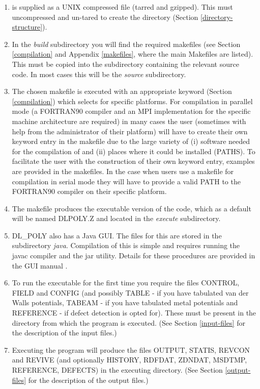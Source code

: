 \begin{enumerate}
\item \D is supplied as a UNIX compressed file (tarred and
gzipped).  This must uncompressed and un-tared to create the \D
directory (Section \ref{directory-structure}).

\item In the {\em build} subdirectory you will find the required
\D makefiles (see Section \ref{compilation} and Appendix
\ref{makefiles}, where the main Makefiles are listed).  This must be
copied into the subdirectory containing the relevant source code. In
most cases this will be the {\em source} subdirectory.

\item The chosen makefile is executed with an appropriate keyword
(Section \ref{compilation}) which selects for specific platforms.
For \D compilation in parallel mode (a FORTRAN90 compiler
and an MPI implementation for the specific machine architecture are
required) in many cases the user (sometimes with help from the
administrator of their platform) will have to create their own
keyword entry in the makefile due to the large variety of (i)
software needed for the compilation of \D and (ii) places where
it could be installed (PATHS).  To facilitate the user with the
construction of their own keyword entry, examples are provided
in the makefiles.  In the case when users use a makefile for \D
compilation in serial mode they will have to provide a valid
PATH to the FORTRAN90 compiler on their specific platform.

\item The makefile produces the executable version of the code,
which as a default will be named DLPOLY.Z and located in the {\em
execute} subdirectory.

\item DL\_POLY also has a Java GUI.  The files for this are stored
in the subdirectory {\em java}. Compilation of this is simple and
requires running the javac compiler and the jar utility.  Details
for these procedures are provided in the GUI manual
\cite{smith-gui}.

\item To run the executable for the first time you require the files
CONTROL, FIELD and CONFIG (and possibly TABLE - if you have
tabulated van der Walls potentials, TABEAM - if you have
tabulated metal potentials and REFERENCE - if defect detection is opted
for).  These must be present in the directory from which the program
is executed. (See Section \ref{input-files} for the description of
the input files.)

\item Executing the program will produce the files OUTPUT, STATIS,
REVCON and REVIVE (and optionally HISTORY, RDFDAT, ZDNDAT, MSDTMP,
REFERENCE, DEFECTS) in the executing directory.
(See Section \ref{output-files} for the description of the output files.)
\end{enumerate}

